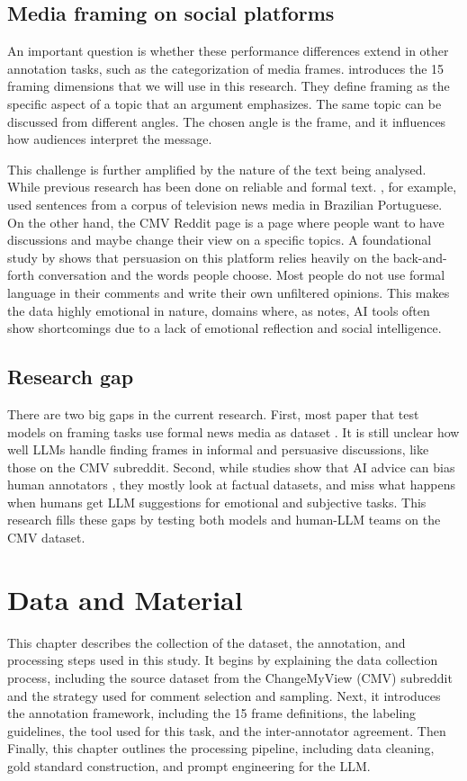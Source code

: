 \documentclass[
10pt, %
a4paper, %
oneside, %
headinclude,footinclude, %
] {book}%
\begin{document}
\section{Media framing on social platforms}
An important question is whether these performance differences extend in other annotation tasks, such as the categorization of media frames. \cite{card2015media} introduces the 15 framing dimensions that we will use in this research. They define framing as the specific aspect of a topic that an argument emphasizes. The same topic can be discussed from different angles. The chosen angle is the frame, and it influences how audiences interpret the message.

This challenge is further amplified by the nature of the text being analysed. While previous research has been done on reliable and formal text. \cite{belcavello2025evaluating}, for example, used sentences from a corpus of television news media in Brazilian Portuguese. On the other hand, the CMV Reddit page is a page where people want to have discussions and maybe change their view on a specific topics. A foundational study by \cite{tan2016winning} shows that persuasion on this platform relies heavily on the back-and-forth conversation and the words people choose. Most people do not use formal language in their comments and write their own unfiltered opinions. This makes the data highly emotional in nature, domains where, as \cite{wilkens2020artificial} notes, AI tools often show shortcomings due to a lack of emotional reflection and social intelligence. 


\section{Research gap}
There are two big gaps in the current research. First, most paper that test models on framing tasks use formal news media as dataset \citep{belcavello2025evaluating, kunjar2025computational}. It is still unclear how well LLMs handle finding frames in informal and persuasive discussions, like those on the CMV subreddit. Second, while studies show that AI advice can bias human annotators \citep{schroeder2025just, beck2026bias}, they mostly look at factual datasets, and miss what happens when humans get LLM suggestions for emotional and subjective tasks. This research fills these gaps by testing both models and human-LLM teams on the CMV dataset.

\chapter{Data and Material}
This chapter describes the collection of the dataset, the annotation, and processing steps used in this study. It begins by explaining the data collection process, including the source dataset from the ChangeMyView (CMV) subreddit and the strategy used for comment selection and sampling. Next, it introduces the annotation framework, including the 15 frame definitions, the labeling guidelines, the tool used for this task, and the inter-annotator agreement. Then Finally, this chapter outlines the processing pipeline, including data cleaning, gold standard construction, and prompt engineering for the LLM. 
\end{document}
